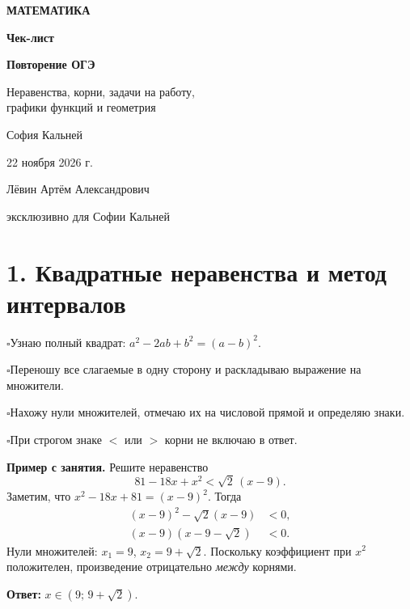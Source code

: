 \documentclass[a4paper,11pt]{article}
\newcommand{\secname}[1]{\section*{\textcolor{darkaccent}{#1}}}
\newcommand{\checkline}[1]{\par\noindent\textcolor{accent}{\(\square\)}\hspace{0.5em}#1\par}
\newcommand{\important}[1]{\textcolor{darkaccent}{\textbf{#1}}}
\begin{document}
\thispagestyle{empty}
\begin{center}
\vspace*{22mm}
{\Large\bfseries\color{muted} МАТЕМАТИКА}\par
\vspace{22mm}
{\fontsize{29}{34}\selectfont\bfseries\color{darkaccent}Чек-лист}\par
\vspace{11mm}
{\Large\bfseries Повторение ОГЭ}\par
\vspace{5mm}
{\large Неравенства, корни, задачи на работу,\\ графики функций и геометрия}\par
\vspace{21mm}
{\Large София Кальней}\par
\vspace{8mm}
{\normalsize 22 ноября 2026 г.}\par
\vfill
{\normalsize Лёвин Артём Александрович}\par
{\small эксклюзивно для Софии Кальней}\par
\vspace{17mm}
\vspace{8mm}
\end{center}
\newpage

\secname{1. Квадратные неравенства и метод интервалов}
\checkline{Узнаю полный квадрат: \(a^2-2ab+b^2=(a-b)^2\).}
\checkline{Переношу все слагаемые в одну сторону и раскладываю выражение на множители.}
\checkline{Нахожу нули множителей, отмечаю их на числовой прямой и определяю знаки.}
\checkline{При строгом знаке \(<\) или \(>\) корни не включаю в ответ.}

\textbf{Пример с занятия.} Решите неравенство
\[
81-18x+x^2<\sqrt2\,(x-9).
\]
Заметим, что \(x^2-18x+81=(x-9)^2\). Тогда
\begin{align*}
(x-9)^2-\sqrt2(x-9)&<0,\\
(x-9)(x-9-\sqrt2)&<0.
\end{align*}
Нули множителей: \(x_1=9\), \(x_2=9+\sqrt2\). Поскольку коэффициент при \(x^2\) положителен, произведение отрицательно \emph{между} корнями.
\begin{center}
\end{center}
\important{Ответ:} \(x\in(9;\,9+\sqrt2)\).
\end{document}
